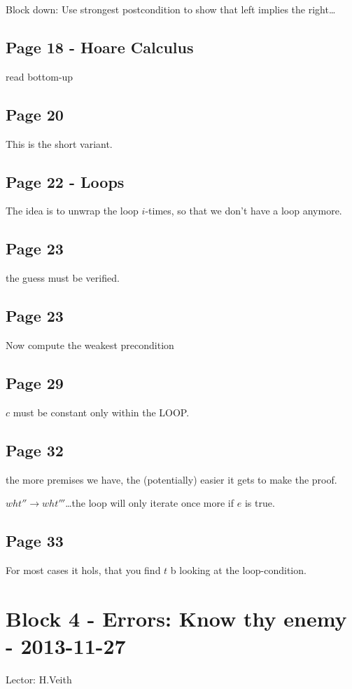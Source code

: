 \documentclass[a4paper]{article}
\begin{document}
Block down: Use strongest postcondition to show that left implies the right\ldots

\subsection{Page 18 - Hoare Calculus}
read bottom-up

\subsection{Page 20}

This is the short variant.

\subsection{Page 22 - Loops}
The idea is to unwrap the loop $i$-times, so that we don't have a loop anymore.

\subsection{Page 23} the guess must be verified.

\subsection{Page 23}
Now compute the weakest precondition


\subsection{Page 29}
$c$ must be constant only within the LOOP.

\subsection{Page 32}
the more premises we have, the (potentially) easier it gets to make the proof.

$wht'' \rightarrow wht'''$\ldots the loop will only iterate once more if $e$
is true.


\subsection{Page 33}
For most cases it hols, that you find $t$ b looking at the loop-condition.


\section{Block 4 - Errors: Know thy enemy - 2013-11-27}
Lector: H.Veith
\end{document}
